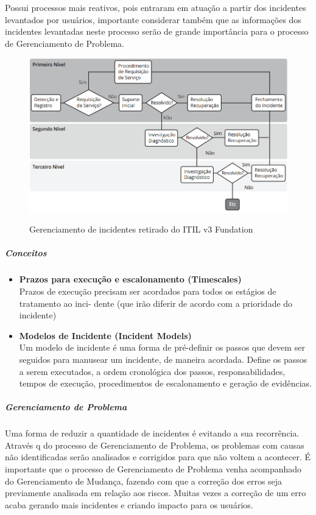 \documentclass[11pt,a4paper]{article}
\begin{document}
Possui processos mais reativos, pois entraram em atuação a partir dos incidentes 
levantados por usuários, importante considerar também que as informações dos 
incidentes levantadas neste processo serão de grande importância para o processo 
de Gerenciamento de Problema.
\\
\begin{figure}[!h]
\caption{Gerenciamento de incidentes retirado do ITIL v3 Fundation}
\centering %
\includegraphics[width=15cm]{itil_images/gerenciamento_de_incidentes.png}
\label{figura:Gerenciamento de incidentes retirado do ITIL v3 Fundation}
\end{figure}

\subparagraph*{Conceitos}
\begin{itemize}[noitemsep]
	\item {\bfseries Prazos para execução e escalonamento (Timescales)} \\
		Prazos de execução precisam ser acordados para todos os estágios de tratamento ao inci-
		dente (que irão diferir de acordo com a prioridade do incidente)
		
	\item {\bfseries Modelos de Incidente (Incident Models) } \\
		Um modelo de incidente é uma forma de pré-definir os passos que devem ser seguidos 
		para manusear um incidente, de maneira acordada. Define os passos a serem executados, a 
		ordem cronológica dos passos, responsabilidades, tempos de execução, procedimentos de 
		escalonamento e geração de evidências.
			
\end{itemize}

	
\subparagraph{Gerenciamento de Problema}
Uma forma de reduzir a quantidade de incidentes é evitando a sua recorrência. Através q
do processo de Gerenciamento de Problema, os problemas com causas não identificadas 
serão analisados e corrigidos para que não voltem a acontecer.
É importante que o processo de Gerenciamento de Problema venha acompanhado do 
Gerenciamento de Mudança, fazendo com que a correção dos erros seja previamente 
analisada em relação aos riscos. Muitas vezes a correção de um erro acaba gerando mais 
incidentes e criando impacto para os usuários.
\end{document}
